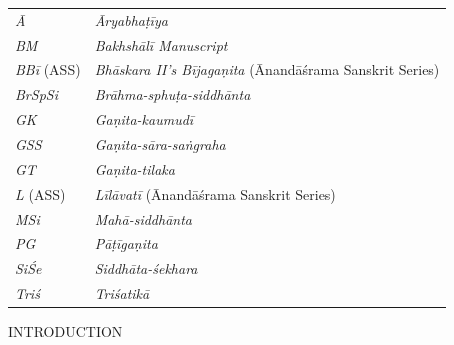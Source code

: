 \documentclass[10pt, openany]{book}
\begin{document}
\begin{tabular}{p{2cm} p{9cm}}

\englishfont \textit{Ā} & \englishfont\textit{Āryabhaṭīya} \\

 \englishfont\textit{BM} & \englishfont\textit{Bakhshālī Manuscript} \\

 \englishfont\textit{BBī} (ASS) & \englishfont\textit{Bhāskara II's Bījagaṇita} (Ānandāśrama Sanskrit Series) \\

 \englishfont\textit{BrSpSi} & \englishfont\textit{Brāhma-sphuṭa-siddhānta}\\

 \englishfont\textit{GK} & \englishfont\textit{Gaṇita-kaumudī}\\

 \englishfont\textit{GSS} & \englishfont\textit{Gaṇita-sāra-saṅgraha}\\

 \englishfont\textit{GT} & \englishfont\textit{Gaṇita-tilaka}\\

\englishfont\textit{L} (ASS) & \englishfont\textit{Līlāvatī} (Ānandāśrama Sanskrit Series) \\

 \englishfont\textit{MSi} & \englishfont\textit{Mahā-siddhānta}\\

 \englishfont\textit{PG} & \englishfont\textit{Pāṭīgaṇita}\\

\englishfont\textit{SiŚe} & \englishfont\textit{Siddhāta-śekhara}\\

\englishfont\textit{Triś} & \englishfont\textit{Triśatikā}\\

\end{tabular}

\newpage

 \label{Int}
\begin{center} {\large INTRODUCTION}\end{center}
\end{document}
